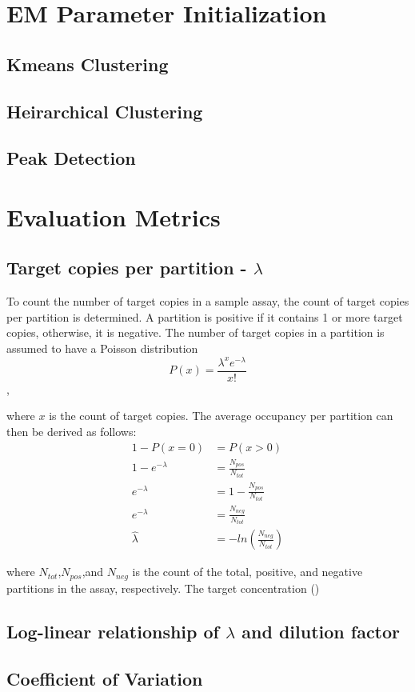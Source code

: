 \section{EM Parameter Initialization}
\label{sec:emparaminit_ch3}

\subsection{Kmeans Clustering}
\label{sec:kmeans}

\subsection{Heirarchical Clustering}
\label{sec:hclust}

\subsection{Peak Detection}
\label{sec:peakdetection}

\section{Evaluation Metrics}
\label{sec:evalmetric_ch3}

\subsection{Target copies per partition - \(\lambda\)}
\label{sec:lambda}
To count the number of target copies in a sample assay, the count of target copies per partition is determined. A partition is positive if it contains 1 or more target copies, otherwise, it is negative. The number of target copies in a partition is assumed to have a Poisson distribution
\[ P(x) = \frac{\lambda^xe^{-\lambda}}{x!} \],

where \(x\) is the count of target copies. The average occupancy per partition can then be derived as follows:
\[ 
    \begin{aligned}
        1-P(x=0) &= P(x>0)\\ 
        1-e^{-\lambda} &= \frac{N_{pos}}{N_{tot}}\\ 
        e^{-\lambda} &= 1-\frac{N_{pos}}{N_{tot}}\\ 
        e^{-\lambda} &= \frac{N_{neg}}{N_{tot}}\\ 
        \hat{\lambda} &= -ln(\frac{N_{neg}}{N_{tot}})
    \end{aligned}
\]

where \(N_{tot}\),\(N_{pos}\),and \(N_{neg}\) is the count of the total, positive, and negative partitions in the assay, respectively. The target concentration ()



\subsection{Log-linear relationship of \(\lambda\) and dilution factor}
\label{sec:loglinear}

\subsection{Coefficient of Variation}
\label{sec:coeffofvar}
